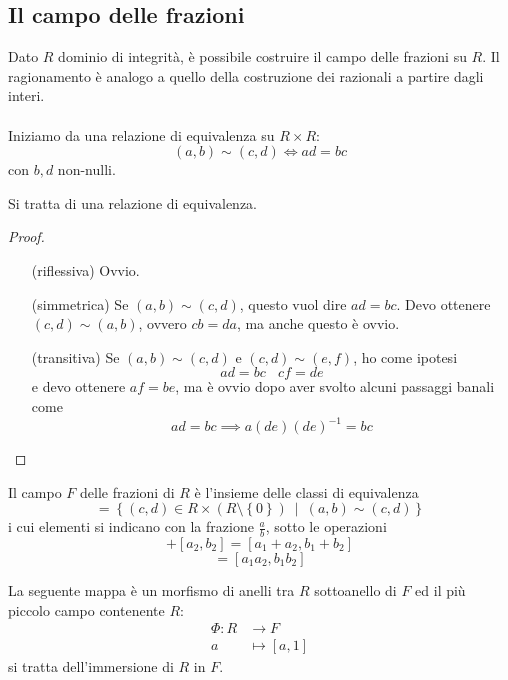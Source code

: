 \subsection{Il campo delle frazioni}
Dato $R$ dominio di integrità, è possibile costruire il campo delle frazioni su $R$. Il ragionamento è analogo a quello della costruzione dei razionali a partire dagli interi. \\ \\ Iniziamo da una relazione di equivalenza su $R\times R$:
\begin{equation*}
	(a,b)\sim(c,d) \iff ad=bc
\end{equation*}
con $b,d$ non-nulli. 
\begin{proposizione}
	Si tratta di una relazione di equivalenza.
\end{proposizione}
\begin{proof}\
	\begin{itemize}
		\item[(riflessiva)] Ovvio.
		\item[(simmetrica)] Se $(a,b)\sim(c,d)$, questo vuol dire $ad=bc$. Devo ottenere $(c,d)\sim(a,b)$, ovvero $cb=da$, ma anche questo è ovvio.
		\item[(transitiva)] Se $(a,b)\sim(c,d)$ e $(c,d)\sim(e,f)$, ho come ipotesi
		\begin{equation*}
			ad=bc \ \ \ \ cf=de
		\end{equation*}
		e devo ottenere $af=be$, ma è ovvio dopo aver svolto alcuni passaggi banali come
		\begin{equation*}
		ad=bc\implies a(de)(de)^{-1}=bc
		\end{equation*}
	\end{itemize}
\end{proof}
\begin{definizione}
	Il campo $F$ delle frazioni di $R$ è l'insieme delle classi di equivalenza 
	\begin{equation*}
	[a,b]=\left\{(c,d)\in R\times (R\setminus\left\{0\right\}) \ \mid \ (a,b)\sim(c,d)\right\}
	\end{equation*}
	i cui elementi si indicano con la frazione $\frac{a}{b}$, sotto le operazioni
	\begin{equation*}
	[a_1,b_1]+[a_2,b_2]=[a_1+a_2,b_1+b_2]
	\end{equation*}
	\begin{equation*}
	[a_1,b_1][a_2,b_2]=[a_1a_2,b_1b_2]
	\end{equation*}
\end{definizione}
\begin{osservazione}[Immersione di $R$ in $F$]
	La seguente mappa è un morfismo di anelli tra $R$ sottoanello di $F$ ed il più piccolo campo contenente $R$:
	\begin{align*}
	\Phi:R&\longrightarrow F\\
	a&\longmapsto [a,1]
	\end{align*}
	si tratta dell'immersione di $R$ in $F$.
\end{osservazione}
